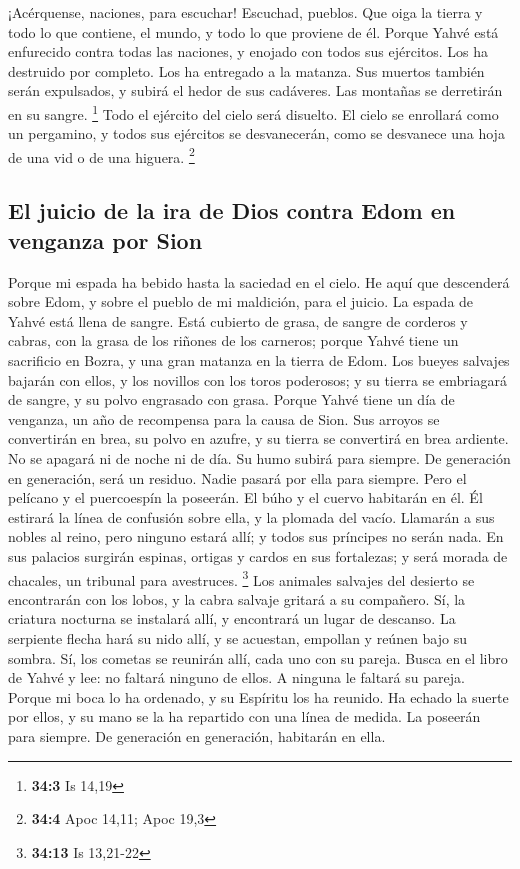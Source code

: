 \begin{paracol}{2}
 ¡Acérquense, naciones, para escuchar! Escuchad, pueblos.
Que oiga la tierra y todo lo que contiene, el mundo, y todo lo que
proviene de él.  Porque Yahvé está enfurecido contra todas
las naciones, y enojado con todos sus ejércitos. Los ha destruido por
completo. Los ha entregado a la matanza.  Sus muertos
también serán expulsados, y subirá el hedor de sus cadáveres. Las
montañas se derretirán en su sangre. \footnote{\textbf{34:3} Is 14,19}
 Todo el ejército del cielo será disuelto. El cielo se
enrollará como un pergamino, y todos sus ejércitos se desvanecerán, como
se desvanece una hoja de una vid o de una higuera. \footnote{\textbf{34:4}
  Apoc 14,11; Apoc 19,3}

\hypertarget{el-juicio-de-la-ira-de-dios-contra-edom-en-venganza-por-sion}{%
\subsection{El juicio de la ira de Dios contra Edom en venganza por
Sion}\label{el-juicio-de-la-ira-de-dios-contra-edom-en-venganza-por-sion}}

 Porque mi espada ha bebido hasta la saciedad en el cielo.
He aquí que descenderá sobre Edom, y sobre el pueblo de mi maldición,
para el juicio.  La espada de Yahvé está llena de sangre.
Está cubierto de grasa, de sangre de corderos y cabras, con la grasa de
los riñones de los carneros; porque Yahvé tiene un sacrificio en Bozra,
y una gran matanza en la tierra de Edom.  Los bueyes
salvajes bajarán con ellos, y los novillos con los toros poderosos; y su
tierra se embriagará de sangre, y su polvo engrasado con grasa.
 Porque Yahvé tiene un día de venganza, un año de
recompensa para la causa de Sion.  Sus arroyos se
convertirán en brea, su polvo en azufre, y su tierra se convertirá en
brea ardiente.  No se apagará ni de noche ni de día. Su
humo subirá para siempre. De generación en generación, será un residuo.
Nadie pasará por ella para siempre.  Pero el pelícano y
el puercoespín la poseerán. El búho y el cuervo habitarán en él. Él
estirará la línea de confusión sobre ella, y la plomada del vacío.
 Llamarán a sus nobles al reino, pero ninguno estará
allí; y todos sus príncipes no serán nada.  En sus
palacios surgirán espinas, ortigas y cardos en sus fortalezas; y será
morada de chacales, un tribunal para avestruces. \footnote{\textbf{34:13}
  Is 13,21-22}  Los animales salvajes del desierto se
encontrarán con los lobos, y la cabra salvaje gritará a su compañero.
Sí, la criatura nocturna se instalará allí, y encontrará un lugar de
descanso.  La serpiente flecha hará su nido allí, y se
acuestan, empollan y reúnen bajo su sombra. Sí, los cometas se reunirán
allí, cada uno con su pareja.  Busca en el libro de Yahvé
y lee: no faltará ninguno de ellos. A ninguna le faltará su pareja.
Porque mi boca lo ha ordenado, y su Espíritu los ha reunido.
 Ha echado la suerte por ellos, y su mano se la ha
repartido con una línea de medida. La poseerán para siempre. De
generación en generación, habitarán en ella.


\end{paracol}
